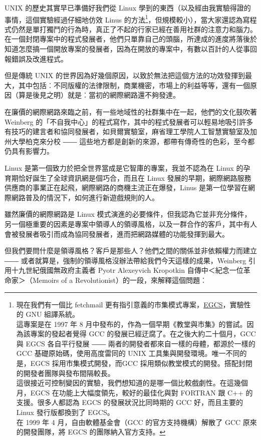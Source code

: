 \documentclass[12pt, a5paper]{book}
\begin{document}
UNIX 的歷史其實早已準備好我們從 Linux
學到的東西（以及經由我實驗得證的事情，這個實驗經過仔細地仿效 Linus
的方法\footnote{現在我們有一個比 fetchmail
  更有指引意義的市集模式專案，\href{http://egcs.cygnus.com/}{EGCS}，實驗性的
  GNU 組譯系統。\\這專案是在 1997 年 8
  月中發布的，作為一個早期《教堂與市集》的嘗試。因為該專案的發起者覺得
  GCC 的發展已經迂腐了。在之後大約二十個月，GCC 與 EGCS 各自平行發展 ――
  兩者的開發者都來自一樣的母體，都源於一樣的 GCC
  基礎原始碼，使用高度雷同的 UNIX 工具集與開發環境。唯一不同的是，EGCS
  採用市集模式開發，而GCC
  採用類似教堂模式的開發。搭配封閉的開發者團隊與發布間隔較長。\\這很接近可控制變因的實驗，我們想知道的是哪一個比較戲劇性。在這幾個月，EGCS
  在功能上大幅度領先，較好的最佳化與對 FORTRAN 跟 C++
  的支援。很多人都認為 EGCS 的發展狀況比同時期的 GCC 好，而且主要的
  Linux 發行版都換到了 EGCS。\\在 1999 年 4 月，自由軟體基金會（GCC
  的官方支持機構）解散了 GCC 原來的開發團隊，將 EGCS
  的團隊納入官方支持。}，但規模較小），當大家還認為寫程式仍然是單打獨鬥的行為時，真正了不起的行家已經在善用社群的注意力和腦力。在一個封閉專案中的程式發展者，他們只單靠自己的頭腦，所達成的進度將落後於知道怎麼搞一個開放專案的發展者，因為在開放的專案中，有數以百計的人從事回報錯誤及改進程式。

但是傳統 UNIX
的世界因為好幾個原因，以致於無法把這個方法的功效發揮到最大，其中包括︰不同版權的法律限制，商業機密，市場上的利益等等，還有一個原因（算是後見之明）就是︰當初的網際網路還不夠發達。

在廉價的網際網路來臨之前，有一些地域性的社群集中在一起，他們的文化鼓吹著
Weinberg
的「不自我中心」的程式寫作，其中的程式發展者可以輕易地吸引許多有技巧的建言者和協同發展者，如貝爾實驗室，麻省理工學院人工智慧實驗室及加州大學柏克來分校
―― 這些地方都是創新的來源，都帶有傳奇性的色彩，至今都仍具有影響力。

Linux 是第一個致力於把全世界當成是它智庫的專案，我並不認為在 Linux
的孕育期恰好誕生了全球資訊網是個巧合，而且在 Linux
發展的早期，網際網路服務供應商的事業正在起飛，網際網路的商機主流正在爆發，Linus
是第一位學習在網際網路普及的情況下，如何進行新遊戲規則的人。

雖然廉價的網際網路是 Linux
模式演進的必要條件，但我認為它並非充分條件，另一個極重要的因素是專案中領導人的領導風格，以及一群合作的客戶，其中有人會被發展者吸引而成為協同發展者，進而把網路媒體的功能發揮到最大。

但我們要問什麼是領導風格？客戶是那些人？他們之間的關係並非依賴權力而建立
―― 或者就算是，強制的領導風格沒辦法帶給我們今天這樣的成果，Weinberg
引用十九世紀俄國無政府主義者 Pyotr Alexeyvich Kropotkin
自傳中＜紀念一位革命家＞（Memoirs of a
Revolutionist）的一段，來解釋這個問題︰
\end{document}
